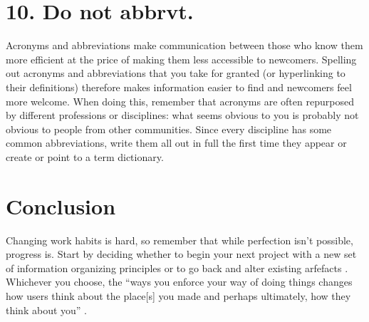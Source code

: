 \documentclass[10pt,letterpaper]{article}
\newcommand{\rulemajor}[1]{\section*{#1}}
\begin{document}
\rulemajor{10. Do not abbrvt.}

Acronyms and abbreviations make communication between those who know them more
efficient at the price of making them less accessible to newcomers. Spelling
out acronyms and abbreviations that you take for granted (or hyperlinking to
their definitions) therefore makes information easier to find and newcomers feel
more welcome. When doing this, remember that acronyms are often repurposed by
different professions or disciplines: what seems obvious to you is probably not
obvious to people from other communities. Since every discipline has some common
abbreviations, write them all out in full the first time they appear or create
or point to a term dictionary.

\section*{Conclusion}

Changing work habits is hard, so remember that while perfection isn't possible,
progress is. Start by deciding whether to begin your next project with a new set
of information organizing principles or to go back and alter existing arfefacts
\cite{Briney2015}. Whichever you choose, the ``ways you enforce your way of
doing things changes how users think about the place[s] you made and perhaps
ultimately, how they think about you'' \cite{Covert2014}.


\end{document}

